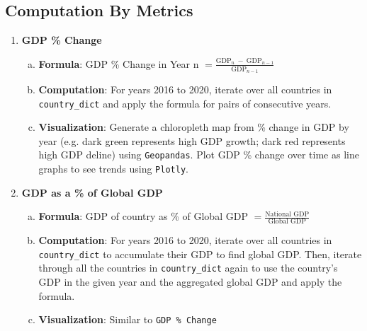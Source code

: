 \documentclass[fontsize=11pt]{article}
\begin{document}
    \subsection*{Computation By Metrics}
    \begin{enumerate}
        \item \textbf{GDP \% Change}
            \begin{enumerate}[(a)]
                \item \textbf{Formula}: GDP \% Change in Year n $= \frac{\text{GDP}_{n} \ - \ \text{GDP}_{n-1}}{\text{GDP}_{n-1}}$
                \item \textbf{Computation}: For years 2016 to 2020, iterate over all countries in \texttt{country\_dict} and apply the formula for pairs of consecutive years.
                \item \textbf{Visualization}: Generate a chloropleth map from \% change in GDP by year (e.g. dark green represents high GDP growth; dark red represents high GDP deline) using \texttt{Geopandas}. Plot GDP \% change over time as line graphs to see trends using \texttt{Plotly}.
            \end{enumerate}

        \item \textbf{GDP as a \% of Global GDP}
            \begin{enumerate}[(a)]
                \item \textbf{Formula}: GDP of country as \% of Global GDP $= \frac{\text{National GDP}}{\text{Global GDP}}$
                \item \textbf{Computation}: For years 2016 to 2020, iterate over all countries in \texttt{country\_dict} to accumulate their GDP to find global GDP. Then, iterate through all the countries in \texttt{country\_dict} again to use the country's GDP in the given year and the aggregated global GDP and apply the formula.
                \item \textbf{Visualization}: Similar to \texttt{GDP \% Change}
            \end{enumerate}


\end{enumerate}
\end{document}
